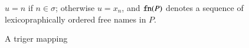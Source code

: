 \begin{figure}[t]
$u = n$ if $n\in \sigma$; otherwise $u = x_n$, and  
$\mathtt{fn}(P)$ denotes a sequence of lexicopraphically ordered 
free names in $P$. 
\caption{\label{f:auxmap} A triger mapping}
\end{figure}

